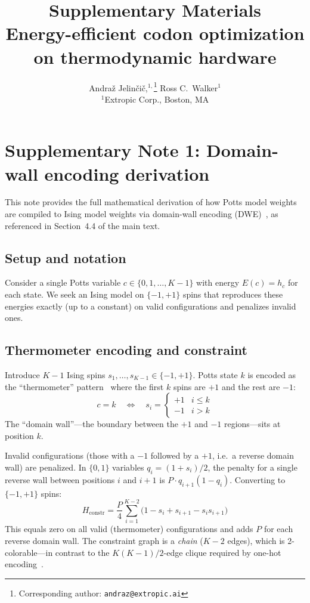 \documentclass[11pt]{article}
\title{Supplementary Materials\\[2mm]
\large Energy-efficient codon optimization on thermodynamic hardware}
\author{
Andraž Jelinčič,$^{1,}$\footnote{Corresponding author: \texttt{andraz@extropic.ai}} \hspace{5mm} Ross C.\ Walker$^{1}$ \\[2mm]
\small $^{1}$Extropic Corp., Boston, MA
}
\date{}
\begin{document}
\maketitle

\section*{Supplementary Note 1: Domain-wall encoding derivation}

This note provides the full mathematical derivation of how Potts model weights are compiled to Ising model weights via domain-wall encoding (DWE)~\cite{chancellor2019dwc, berwald2022dwc}, as referenced in Section~4.4 of the main text.

\subsection*{Setup and notation}

Consider a single Potts variable $c \in \{0, 1, \ldots, K{-}1\}$ with energy $E(c) = h_c$ for each state.
We seek an Ising model on $\{-1,+1\}$ spins that reproduces these energies exactly (up to a constant) on valid configurations and penalizes invalid ones.

\subsection*{Thermometer encoding and constraint}

Introduce $K{-}1$ Ising spins $s_1, \ldots, s_{K-1} \in \{-1,+1\}$.
Potts state $k$ is encoded as the ``thermometer'' pattern~\cite{chancellor2019dwc} where the first $k$ spins are $+1$ and the rest are $-1$:
\begin{equation}\label{eq:thermo}
  c = k \quad\Longleftrightarrow\quad
  s_i = \begin{cases} +1 & i \leq k \\ -1 & i > k \end{cases}
\end{equation}
The ``domain wall''---the boundary between the $+1$ and $-1$ regions---sits at position $k$.

Invalid configurations (those with a $-1$ followed by a $+1$, i.e.\ a reverse domain wall) are penalized.
In $\{0,1\}$ variables $q_i = (1+s_i)/2$, the penalty for a single reverse wall between positions $i$ and $i{+}1$ is $P \cdot q_{i+1}(1 - q_i)$.
Converting to $\{-1,+1\}$ spins:
\begin{equation}\label{eq:constraint}
  H_{\mathrm{constr}} = \frac{P}{4} \sum_{i=1}^{K-2} \bigl(1 - s_i + s_{i+1} - s_i s_{i+1}\bigr)
\end{equation}
This equals zero on all valid (thermometer) configurations and adds $P$ for each reverse domain wall.
The constraint graph is a \emph{chain} ($K{-}2$ edges), which is 2-colorable---in contrast to the $K(K{-}1)/2$-edge clique required by one-hot encoding~\cite{lucas2014ising}.
\end{document}
